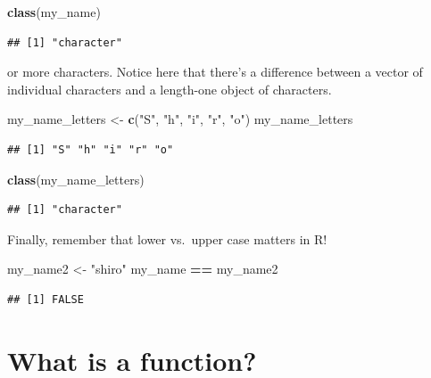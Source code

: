 \documentclass[]{book}
\newenvironment{Shaded}{\begin{snugshade}}{\end{snugshade}}
\newcommand{\KeywordTok}[1]{\textcolor[rgb]{0.13,0.29,0.53}{\textbf{#1}}}
\newcommand{\StringTok}[1]{\textcolor[rgb]{0.31,0.60,0.02}{#1}}
\newcommand{\OperatorTok}[1]{\textcolor[rgb]{0.81,0.36,0.00}{\textbf{#1}}}
\newcommand{\NormalTok}[1]{#1}
\theoremstyle{definition}
\theoremstyle{definition}
\theoremstyle{definition}
\theoremstyle{remark}
\begin{document}
\begin{Shaded}
\begin{Highlighting}[]
\KeywordTok{class}\NormalTok{(my_name)}
\end{Highlighting}
\end{Shaded}

\begin{verbatim}
## [1] "character"
\end{verbatim}

or more characters. Notice here that there's a difference between a
vector of individual characters and a length-one object of characters.

\begin{Shaded}
\begin{Highlighting}[]
\NormalTok{my_name_letters <-}\StringTok{ }\KeywordTok{c}\NormalTok{(}\StringTok{"S"}\NormalTok{, }\StringTok{"h"}\NormalTok{, }\StringTok{"i"}\NormalTok{, }\StringTok{"r"}\NormalTok{, }\StringTok{"o"}\NormalTok{)}
\NormalTok{my_name_letters}
\end{Highlighting}
\end{Shaded}

\begin{verbatim}
## [1] "S" "h" "i" "r" "o"
\end{verbatim}

\begin{Shaded}
\begin{Highlighting}[]
\KeywordTok{class}\NormalTok{(my_name_letters)}
\end{Highlighting}
\end{Shaded}

\begin{verbatim}
## [1] "character"
\end{verbatim}

Finally, remember that lower vs.~upper case matters in R!

\begin{Shaded}
\begin{Highlighting}[]
\NormalTok{my_name2 <-}\StringTok{ "shiro"}
\NormalTok{my_name }\OperatorTok{==}\StringTok{ }\NormalTok{my_name2}
\end{Highlighting}
\end{Shaded}

\begin{verbatim}
## [1] FALSE
\end{verbatim}

\section{What is a function?}\label{what-is-a-function}
\end{document}
